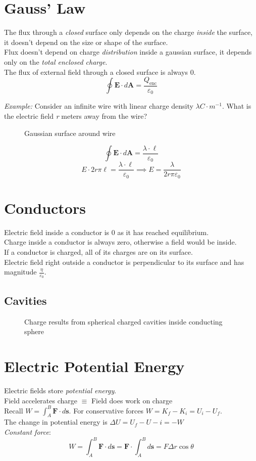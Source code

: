 \section{Gauss' Law}
The flux through a \emph{closed} surface only depends on the charge \emph{inside} the surface, it doesn’t depend on the size or shape of the surface.\\
Flux doesn’t depend on charge \emph{distribution} inside a gaussian surface, it depends only on the \emph{total enclosed charge}.\\
The flux of external field through a closed surface is always 0. 
$$\oint\mathbf{E}\cdot d\mathbf{A}=\frac{Q_{\text{enc}}}{\varepsilon_0}$$

\emph{Example:}
Consider an infinite wire with linear charge density $\lambda C\cdot m^{-1}$. What is the electric field \emph{r} meters away from the wire?
\begin{figure}[H]
    \centering
    
    \caption{Gaussian surface around wire}
\end{figure}
$$\oint\mathbf{E}\cdot d\mathbf{A}=\frac{\lambda\cdot\ell}{\varepsilon_0}$$
$$E\cdot{2r\pi\ell}=\frac{\lambda\cdot\ell}{\varepsilon_0}\implies E=\frac{\lambda}{2r\pi\varepsilon_0}$$
\section{Conductors}
Electric field inside a conductor is 0 as it has reached equilibrium.\\
Charge inside a conductor is always zero, otherwise a field would be inside.\\
If a conductor is charged, all of its charges are on its surface.\\
Electric field right outside a conductor is perpendicular to its surface and has magnitude $\frac{\eta}{\varepsilon_0}$.
\subsection{Cavities}
\begin{figure}[H]
    \centering
    
    \caption{Charge results from spherical charged cavities inside conducting sphere}
\end{figure}
\section{Electric Potential Energy}
Electric fields store \emph{potential energy}.\\
Field accelerates charge $\equiv$ Field does work on charge\\
Recall $W = \int_A^B\mathbf{F}\cdot d\mathbf{s}$. For conservative forces $W=K_f-K_i=U_i-U_f$.\\
The change in potential energy is $\Delta U=U_f-U-i=-W$\\
\emph{Constant force}:
$$W=\int_A^B\mathbf{F}\cdot d\mathbf{s}=\mathbf{F}\cdot\int_A^Bd\mathbf{s}=F\Delta r\cos\theta$$
